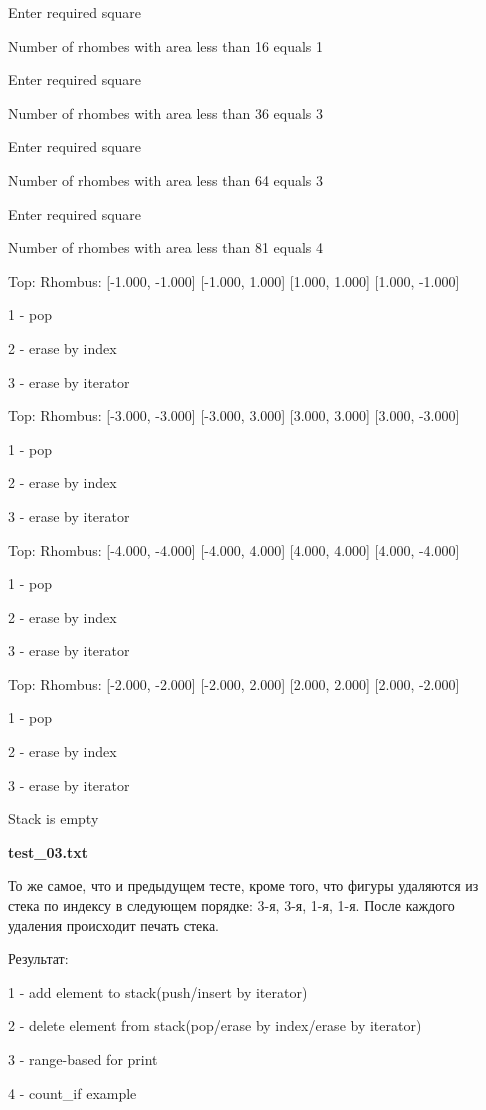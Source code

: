 \documentclass[a4paper, 12pt]{article}
\begin{document}
Enter required square

Number of rhombes with area less than 16 equals 1

Enter required square

Number of rhombes with area less than 36 equals 3

Enter required square

Number of rhombes with area less than 64 equals 3

Enter required square

Number of rhombes with area less than 81 equals 4

Top: Rhombus: [-1.000, -1.000] [-1.000, 1.000] [1.000, 1.000] [1.000, -1.000] 

1 - pop

2 - erase by index

3 - erase by iterator

Top: Rhombus: [-3.000, -3.000] [-3.000, 3.000] [3.000, 3.000] [3.000, -3.000] 

1 - pop

2 - erase by index

3 - erase by iterator

Top: Rhombus: [-4.000, -4.000] [-4.000, 4.000] [4.000, 4.000] [4.000, -4.000] 

1 - pop

2 - erase by index

3 - erase by iterator

Top: Rhombus: [-2.000, -2.000] [-2.000, 2.000] [2.000, 2.000] [2.000, -2.000] 

1 - pop

2 - erase by index

3 - erase by iterator

Stack is empty

\vspace{3ex}

\textbf{test\_03.txt} 

То же самое, что и предыдущем тесте, кроме того, что фигуры удаляются из стека по индексу в следующем порядке: 3-я, 3-я, 1-я, 1-я. После каждого удаления происходит печать стека.

Результат:

1 - add element to stack(push/insert by iterator)

2 - delete element from stack(pop/erase by index/erase by iterator)

3 - range-based for print

4 - count\_if example
\end{document}
